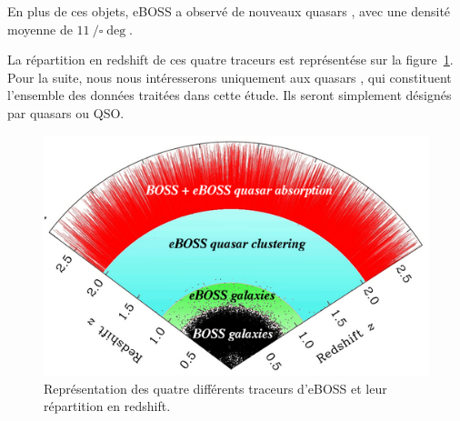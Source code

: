 {\begin{itemize}
  En plus de ces objets, eBOSS a observé de nouveaux quasars \lya{}, avec une densité moyenne de $\SI{11}{\per\square\deg}$.
\end{itemize}
La répartition en redshift de ces quatre traceurs est représentése sur la figure~\ref{fig:eBOSStracers}.
Pour la suite, nous nous intéresserons uniquement aux quasars \lya{}, qui constituent l'ensemble des données traitées dans cette étude. Ils seront simplement désignés par quasars ou QSO.
}
\begin{figure}
  \centering
  \includegraphics[scale=0.5]{eBOSStracers}
  \caption{Représentation des quatre différents traceurs d'eBOSS et leur r\'epartition en redshift.}
  \label{fig:eBOSStracers}
\end{figure}
\paragraph{}





